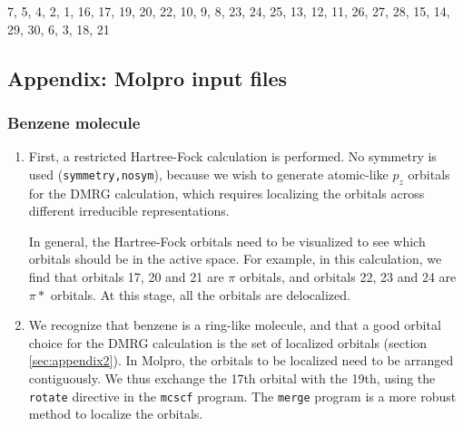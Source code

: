 \documentclass[letterpaper,12pt,aps, pra]{revtex4-1}
\begin{document}
 7,  5,  4,  2,  1,
16, 17, 19, 20, 22,
10,  9,  8, 23, 24,
25, 13, 12, 11, 26,
27, 28, 15, 14, 29,
30,  6,  3, 18, 21            


\subsection{Appendix: Molpro input files}\label{sec:appMolpro}

 \subsubsection{Benzene molecule}
 \label{sec:appMolprobenz}
\begin{enumerate}

 \item First, a restricted Hartree-Fock calculation is performed. No symmetry
	 is used (\texttt{symmetry,nosym}), because we wish to generate
	 atomic-like $p_z$ orbitals for the DMRG calculation, which requires
	 localizing the orbitals across different irreducible representations. 

In general, the Hartree-Fock orbitals need to be visualized to see which
orbitals should be in the active space. For example, in this calculation, we
find that orbitals 17, 20 and 21 are $\pi$ orbitals, and orbitals 22, 23 and 24
are $\pi*$ orbitals.  At this stage, all the orbitals are delocalized.


\item We recognize that benzene is a ring-like molecule, and that a good
	orbital choice for the DMRG calculation is the set of localized
	orbitals (section \ref{sec:appendix2}). In Molpro, the orbitals to be
	localized need to be arranged contiguously. We thus exchange the 17th
	orbital with the 19th, using the \texttt{rotate} directive in the
	\texttt{mcscf} program. The \texttt{merge} program is a more robust
	method to localize the orbitals.



\end{enumerate}
\end{document}
